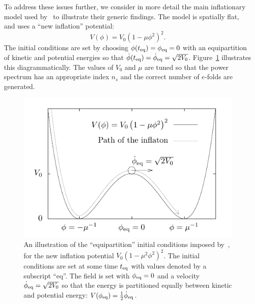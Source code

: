 To address these issues further, we consider in more detail the main inflationary model used by~\cite{boyanovsky_cmb_2006} to illustrate their generic findings.  The model is spatially flat, and uses a ``new inflation'' potential:
\begin{equation}
  V(\phi) =V_0{\left(1-\mu\phi^2\right)}^2.
\end{equation}
The initial conditions are set by choosing \(\phi(t_{\mathrm{eq}})=\phi_{\mathrm{eq}}=0\) with an equipartition of kinetic and potential energies so that \(\dot{\phi}(t_{\mathrm{eq}})=\dot{\phi}_{\mathrm{eq}}=\sqrt{2V_0}\).  Figure~\ref{fig:figure_BVS_initial_conditions} illustrates this diagrammatically.  The values of \(V_0\) and \(\mu\) are tuned so that the power spectrum has an appropriate index \(n_s\) and the correct number of \(e\)-folds are generated.

\begin{figure}[tp]
  \includegraphics[width=\textwidth]{chapters/kinetic_dominance/figures/newpot}
  \caption{An illustration of the ``equipartition'' initial conditions imposed by~\protect\cite{boyanovsky_cmb_2006}, for the new inflation potential \(V_0{\left(1-\mu^2\phi^2\right)}^2\). The initial conditions are set at some time \(t_{\mathrm{eq}}\) with values denoted by a subscript ``eq''. The field is set with \(\phi_{\mathrm{eq}}=0\) and a velocity \(\dot{\phi}_{\mathrm{eq}}= \sqrt{2V_0}\) so that the energy is partitioned equally between kinetic and potential energy: \(V(\phi_{\mathrm{eq}}) = \frac{1}{2}\dot{\phi}_{\mathrm{eq}}\).}\label{fig:figure_BVS_initial_conditions}
\end{figure}

